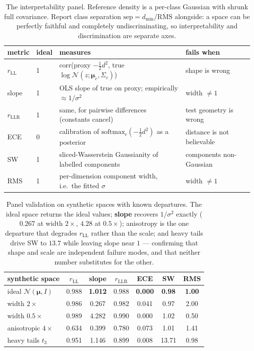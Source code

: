 \documentclass{article}
\newcommand{\N}{\mathcal{N}}
\newcommand{\mmu}{\boldsymbol{\mu}}
\newcommand{\best}[1]{\textbf{#1}}
\begin{document}
\begin{table}[t]\centering\small
\begin{tabular}{llll}
\toprule
metric & ideal & measures & fails when \\
\midrule
$r_{\mathrm{LL}}$ & 1 & corr(proxy $-\tfrac12 d^2$, true $\log\N(z;\mmu_c,\Sigma_c)$) & shape is wrong \\
slope & 1 & OLS slope of true on proxy; empirically $\approx 1/\sigma^2$ & width $\neq 1$ \\
$r_{\mathrm{LLR}}$ & 1 & same, for pairwise differences (constants cancel) & test geometry is wrong \\
ECE & 0 & calibration of $\mathrm{softmax}_c(-\tfrac12 d^2)$ as a posterior & distance is not believable \\
SW & 1 & sliced-Wasserstein Gaussianity of labelled components & components non-Gaussian \\
RMS & 1 & per-dimension component width, i.e.\ the fitted $\sigma$ & width $\neq 1$ \\
\bottomrule
\end{tabular}
\caption{The interpretability panel. Reference density is a per-class Gaussian
with shrunk full covariance. Report class separation
$\mathrm{sep}=d_{\min}/\overline{\mathrm{RMS}}$ alongside: a space can be
perfectly faithful and completely undiscriminating, so interpretability and
discrimination are separate axes.}
\label{tab:panel}
\end{table}

\begin{table}[t]\centering\small
\begin{tabular}{lcccccc}
\toprule
synthetic space & $r_{\mathrm{LL}}$ & slope & $r_{\mathrm{LLR}}$ & ECE & SW & RMS \\
\midrule
ideal $\N(\mmu,I)$      & 0.988 & \best{1.012} & 0.988 & \best{0.000} & \best{0.98} & \best{1.00} \\
width $2\times$         & 0.986 & 0.267 & 0.982 & 0.041 & 0.97 & 2.00 \\
width $0.5\times$       & 0.989 & 4.282 & 0.990 & 0.000 & 1.02 & 0.50 \\
anisotropic $4\times$   & 0.634 & 0.399 & 0.780 & 0.073 & 1.01 & 1.41 \\
heavy tails $t_3$       & 0.951 & 1.146 & 0.899 & 0.008 & 13.71 & 0.98 \\
\bottomrule
\end{tabular}
\caption{Panel validation on synthetic spaces with known departures. The ideal
space returns the ideal values; \textbf{slope} recovers $1/\sigma^2$ exactly
($0.267$ at width $2\times$, $4.28$ at $0.5\times$); anisotropy is the one
departure that degrades $r_{\mathrm{LL}}$ rather than the scale; and heavy tails
drive SW to $13.7$ while leaving slope near $1$ --- confirming that shape and
scale are independent failure modes, and that neither number substitutes for the
other.}
\label{tab:panel-val}
\end{table}
\end{document}
